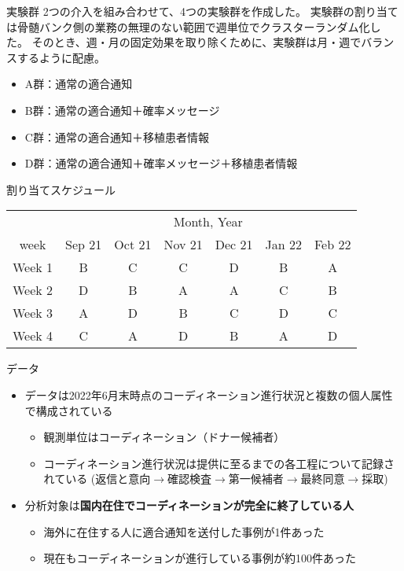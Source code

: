 \documentclass[
      aspectratio=169,
        12pt,
    ]{beamer}
\renewcommand{\textbf}[1]{{\color{DarkBlue}\bfseries#1}}
\providecommand{\tightlist}{%
  \setlength{\itemsep}{0pt}\setlength{\parskip}{0pt}}
\begin{document}
\begin{frame}{実験群}
\protect\hypertarget{ux5b9fux9a13ux7fa4}{}
2つの介入を組み合わせて、4つの実験群を作成した。
実験群の割り当ては骨髄バンク側の業務の無理のない範囲で週単位でクラスターランダム化した。
そのとき、週・月の固定効果を取り除くために、実験群は月・週でバランスするように配慮。

\begin{itemize}
\tightlist
\item
  A群：通常の適合通知
\item
  B群：通常の適合通知＋確率メッセージ
\item
  C群：通常の適合通知＋移植患者情報
\item
  D群：通常の適合通知＋確率メッセージ＋移植患者情報
\end{itemize}
\end{frame}

\begin{frame}{割り当てスケジュール}
\protect\hypertarget{ux5272ux308aux5f53ux3066ux30b9ux30b1ux30b8ux30e5ux30fcux30eb}{}
\begin{table}
\centering
\begin{tabular}[t]{ccccccc}
\toprule
\multicolumn{1}{c}{ } & \multicolumn{6}{c}{Month, Year} \\
\cmidrule(l{3pt}r{3pt}){2-7}
week & Sep 21 & Oct 21 & Nov 21 & Dec 21 & Jan 22 & Feb 22\\
\midrule
Week 1 & B & C & C & D & B & A\\
Week 2 & D & B & A & A & C & B\\
Week 3 & A & D & B & C & D & C\\
Week 4 & C & A & D & B & A & D\\
\bottomrule
\end{tabular}
\end{table}
\end{frame}

\begin{frame}{データ}
\protect\hypertarget{ux30c7ux30fcux30bf}{}
\begin{itemize}
\tightlist
\item
  データは2022年6月末時点のコーディネーション進行状況と複数の個人属性で構成されている

  \begin{itemize}
  \tightlist
  \item
    観測単位はコーディネーション（ドナー候補者）
  \item
    コーディネーション進行状況は提供に至るまでの各工程について記録されている
    (返信と意向\(\to\)確認検査\(\to\)第一候補者\(\to\)最終同意\(\to\)採取)
  \end{itemize}
\item
  分析対象は\textbf{国内在住でコーディネーションが完全に終了している人}

  \begin{itemize}
  \tightlist
  \item
    海外に在住する人に適合通知を送付した事例が1件あった
  \item
    現在もコーディネーションが進行している事例が約100件あった
  \end{itemize}
\end{itemize}
\end{frame}
\end{document}
